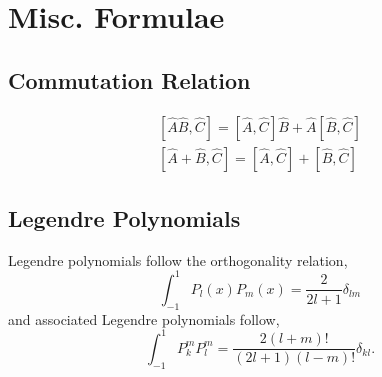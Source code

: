 \documentclass{book}
\begin{document}
\chapter{Misc. Formulae}
\section{Commutation Relation}
\begin{align}
	\left[\hat{A}\hat{B}, \hat{C}\right] = \left[\hat{A}, \hat{C}\right]\hat{B} + \hat{A}\left[\hat{B},\hat{C}\right] \\
	\left[\hat{A} + \hat{B}, \hat{C}\right] = \left[\hat{A}, \hat{C}\right] + \left[\hat{B},\hat{C}\right]
\end{align}
\section{Legendre Polynomials}
Legendre polynomials follow the orthogonality relation,
\begin{equation}
	\int_{-1}^1 P_l(x)P_m(x) = \frac{2}{2l+1}\delta_{lm}
\end{equation}
and associated Legendre polynomials follow,
\begin{equation}
	\int_{-1}^1 P_k^mP_l^m = \frac{2(l+m)!}{(2l+1)(l-m)!}\delta_{kl}.
\end{equation}
\end{document}
